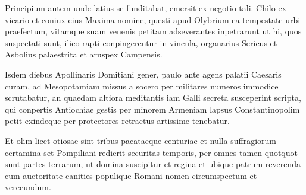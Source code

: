\documentclass[a4paper]{article}
\begin{document}
{Principium autem unde latius se funditabat, emersit ex negotio tali. Chilo ex vicario et coniux eius Maxima nomine, questi apud Olybrium ea tempestate urbi praefectum, vitamque suam venenis petitam adseverantes inpetrarunt ut hi, quos suspectati sunt, ilico rapti conpingerentur in vincula, organarius Sericus et Asbolius palaestrita et aruspex Campensis.

Isdem diebus Apollinaris Domitiani gener, paulo ante agens palatii Caesaris curam, ad Mesopotamiam missus a socero per militares numeros immodice scrutabatur, an quaedam altiora meditantis iam Galli secreta susceperint scripta, qui conpertis Antiochiae gestis per minorem Armeniam lapsus Constantinopolim petit exindeque per protectores retractus artissime tenebatur.

Et olim licet otiosae sint tribus pacataeque centuriae et nulla suffragiorum certamina set Pompiliani redierit securitas temporis, per omnes tamen quotquot sunt partes terrarum, ut domina suscipitur et regina et ubique patrum reverenda cum auctoritate canities populique Romani nomen circumspectum et verecundum.


}
\end{document}
